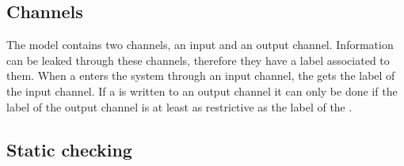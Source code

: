 \subsection{Channels}
The model contains two channels, an input and an output channel.
Information can be leaked through these channels, therefore they have a label associated to them.
When a \xvalue{} enters the system through an input channel, the \xvalue{} gets the label of the input channel.
If a \xvalue{} is written to an output channel it can only be done if the label of the output channel is at least as restrictive as the label of the \xvalue{}.

\subsection{Static checking}
